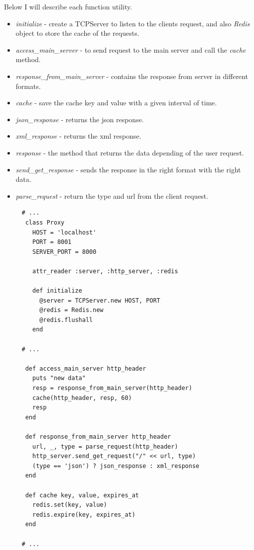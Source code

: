 \documentclass[12pt]{article}
\begin{document}
    Below I will describe each function utility. 

    \begin{itemize}
      \renewcommand{\labelitemi}{$\circ$}
      \item \textit{initialize} - create a TCPServer to listen to the clients request, and also \textit{Redis} object
      to store the cache of the requests.
      \item \textit{access\_main\_server} - to send request to the main server and call the \textit{cache} method.
      \item \textit{response\_from\_main\_server} - contains the response from server in different formats.
      \item \textit{cache} - save the cache key and value with a given interval of time.
      \item \textit{json\_response} - returns the json response. 
      \item \textit{xml\_response} - returns the xml response.
      \item \textit{response} - the method that returns the data depending of the user request.
      \item \textit{send\_get\_response} -  sends the response in the right format with the right data.
      \item \textit{parse\_request} - return the type and url from the client request.
    \end{itemize}

    \begin{lstlisting}
     # ... 
      class Proxy
        HOST = 'localhost'
        PORT = 8001
        SERVER_PORT = 8000

        attr_reader :server, :http_server, :redis

        def initialize
          @server = TCPServer.new HOST, PORT
          @redis = Redis.new
          @redis.flushall
        end

     # ... 

      def access_main_server http_header
        puts "new data"
        resp = response_from_main_server(http_header)
        cache(http_header, resp, 60)
        resp
      end

      def response_from_main_server http_header
        url, _, type = parse_request(http_header)
        http_server.send_get_request("/" << url, type)
        (type == 'json') ? json_response : xml_response
      end

      def cache key, value, expires_at
        redis.set(key, value)
        redis.expire(key, expires_at)
      end

     # ... 
    \end{lstlisting}
\end{document}
